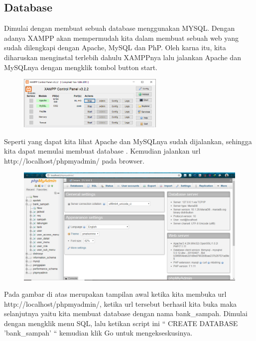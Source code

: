 \subsection{Database}

Dimulai dengan membuat sebuah database menggunakan MYSQL. Dengan adanya XAMPP akan mempermudah kita dalam membuat sebuah web yang sudah dilengkapi dengan Apache, MySQL dan PhP. Oleh karna itu, kita diharuskan menginstal terlebih dahulu XAMPPnya lalu jalankan Apache dan MySQLnya dengan mengklik tombol button start.

\begin{figure}[H]
	\centering
	\includegraphics[width=7cm]{figures/database/1.png}
\end{figure}

\noindent
Seperti yang dapat kita lihat Apache dan MySQLnya sudah dijalankan, sehingga kita dapat memulai membuat database . Kemudian jalankan url http://localhost/phpmyadmin/ pada browser.

\begin{figure}[H]
\centering
\includegraphics[width=1\textwidth]{figures/database/2.png}
\end{figure}

\noindent
Pada gambar di atas merupakan tampilan awal ketika kita membuka url http://localhost/phpmyadmin/, ketika url tersebut berhasil kita buka maka selanjutnya yaitu kita membuat database dengan nama bank\_sampah. Dimulai dengan mengklik menu SQL, lalu ketikan script ini “ CREATE DATABASE 'bank\_sampah' “ kemudian klik Go untuk mengekseskusinya.

